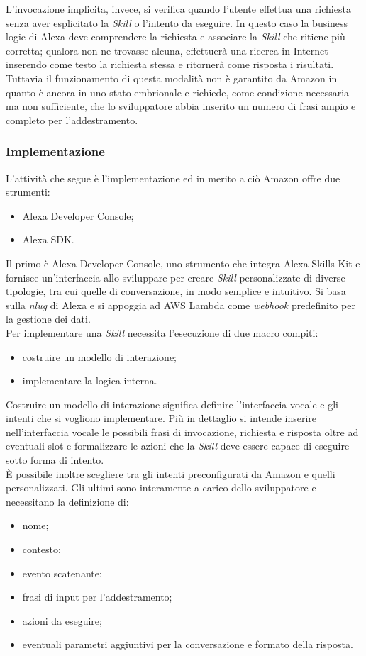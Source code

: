 		L'invocazione implicita, invece, si verifica quando l'utente effettua una richiesta senza aver esplicitato la \emph{Skill} o l'intento da eseguire. In questo caso la business logic di Alexa deve comprendere la richiesta e associare la \emph{Skill} che ritiene più corretta; qualora non ne trovasse alcuna, effettuerà una ricerca in Internet inserendo come testo la richiesta stessa e ritornerà come risposta i risultati. Tuttavia il funzionamento di questa modalità non è garantito da Amazon in quanto è ancora in uno stato embrionale e richiede, come condizione necessaria ma non sufficiente, che lo sviluppatore abbia inserito un numero di frasi ampio e completo per l'addestramento.
		\subsubsection{Implementazione}
		L'attività che segue è l'implementazione ed in merito a ciò Amazon offre due strumenti:
		\begin{itemize}
			\item Alexa Developer Console;
			\item Alexa SDK.
		\end{itemize}
		Il primo è Alexa Developer Console, uno strumento che integra Alexa Skills Kit e fornisce un'interfaccia allo sviluppare per creare \emph{Skill} personalizzate di diverse tipologie, tra cui quelle di conversazione, in modo semplice e intuitivo. Si basa sulla \emph{\gls{nlug}} di Alexa e si appoggia ad {AWS Lambda} come \emph{webhook} predefinito per la gestione dei dati. \\
		Per implementare una \emph{Skill} necessita l'esecuzione di due macro compiti:
		\begin{itemize}
			\item costruire un modello di interazione;
			\item implementare la logica interna.
		\end{itemize}
		Costruire un modello di interazione significa definire l'interfaccia vocale e gli intenti che si vogliono implementare. Più in dettaglio si intende inserire nell'interfaccia vocale le possibili frasi di invocazione, richiesta e risposta oltre ad eventuali slot e formalizzare le azioni che la \emph{Skill} deve essere capace di eseguire sotto forma di intento.\\
		È possibile inoltre scegliere tra gli intenti preconfigurati da Amazon e quelli personalizzati. Gli ultimi sono interamente a carico dello sviluppatore e necessitano la definizione di:
		\begin{itemize}
			\item nome;
			\item contesto;
			\item evento scatenante;
			\item frasi di input per l'addestramento;
			\item azioni da eseguire;
			\item eventuali parametri aggiuntivi per la conversazione e formato della risposta.
		\end{itemize}
